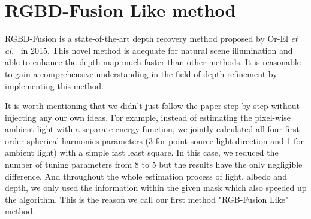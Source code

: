\section{RGBD-Fusion Like method}
RGBD-Fusion is a state-of-the-art depth recovery method proposed by Or-El \emph{et al.}~\cite{or2015rgbd} in 2015.
This novel method is adequate for natural scene illumination and able to enhance the depth map much faster than other methods.
It is reasonable to gain a comprehensive understanding in the field of depth refinement by implementing this method.

It is worth mentioning that we didn't just follow the paper step by step without injecting any our own ideas.
For example, instead of estimating the pixel-wise ambient light with a separate energy function, we jointly calculated all four first-order spherical harmonics parameters (3 for point-source light direction and 1 for ambient light) with a simple fast least square.
In this case, we reduced the number of tuning parameters from 8 to 5 but the results have the only negligible difference.
And throughout the whole estimation process of light, albedo and depth, we only used the information within the given mask which also speeded up the algorithm.
This is the reason we call our first method "RGB-Fusion Like" method.

